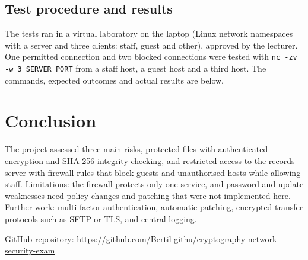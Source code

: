 \documentclass[11pt,a4paper]{article}
\begin{document}
\subsection{Test procedure and results}
The tests ran in a virtual laboratory on the laptop (Linux network namespaces with a server and three clients: staff, guest and other), approved by the lecturer. One permitted connection and two blocked connections were tested with \texttt{nc -zv -w 3 SERVER PORT} from a staff host, a guest host and a third host. The commands, expected outcomes and actual results are below.


\section{Conclusion}
The project assessed three main risks, protected files with authenticated encryption and SHA-256 integrity checking, and restricted access to the records server with firewall rules that block guests and unauthorised hosts while allowing staff. Limitations: the firewall protects only one service, and password and update weaknesses need policy changes and patching that were not implemented here. Further work: multi-factor authentication, automatic patching, encrypted transfer protocols such as SFTP or TLS, and central logging.

GitHub repository: \url{https://github.com/Bertil-githu/cryptography-network-security-exam}
\end{document}
